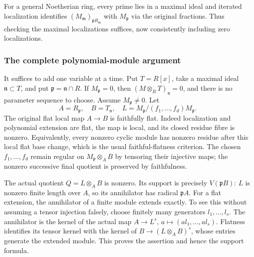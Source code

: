 For a general Noetherian ring, every prime lies in a maximal ideal and iterated localization identifies \((M_{\mathfrak m})_{\mathfrak pR_{\mathfrak m}}\) with \(M_{\mathfrak p}\) via the original fractions. Thus checking the maximal localizations suffices, now consistently including zero localizations.

\subsubsection{The complete polynomial-module argument}\label{the-complete-polynomial-module-argument}

It suffices to add one variable at a time. Put \(T=R[x]\), take a maximal ideal \(\mathfrak n\subset T\), and put \(\mathfrak p=\mathfrak n\cap R\). If \(M_{\mathfrak p}=0\), then \((M\otimes_R T)_{\mathfrak n}=0\), and there is no parameter sequence to choose. Assume \(M_{\mathfrak p}\ne0\). Let \[
 A=R_{\mathfrak p},\quad B=T_{\mathfrak n},\quad
 L=M_{\mathfrak p}/(f_1,\ldots,f_d)M_{\mathfrak p}.
\] The original flat local map \(A\to B\) is faithfully flat. Indeed localization and polynomial extension are flat, the map is local, and its closed residue fibre is nonzero. Equivalently, every nonzero cyclic module has nonzero residue after this local flat base change, which is the usual faithful-flatness criterion. The chosen \(f_1,\ldots,f_d\) remain regular on \(M_{\mathfrak p}\otimes_A B\) by tensoring their injective maps; the nonzero successive final quotient is preserved by faithfulness.

The actual quotient \(Q=L\otimes_A B\) is nonzero. Its support is precisely \(V(\mathfrak pB)\): \(L\) is nonzero finite length over \(A\), so its annihilator has radical \(\mathfrak pA\). For a flat extension, the annihilator of a finite module extends exactly. To see this without assuming a tensor injection falsely, choose finitely many generators \(l_1,\ldots,l_s\). The annihilator is the kernel of the actual map \(A\to L^s\), \(a\mapsto(al_1,\ldots,al_s)\). Flatness identifies its tensor kernel with the kernel of \(B\to(L\otimes_A B)^s\), whose entries generate the extended module. This proves the assertion and hence the support formula.

